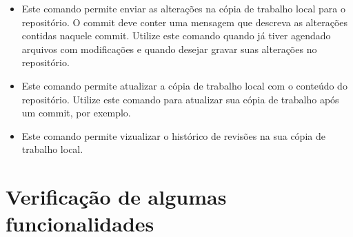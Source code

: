 \begin{itemize}
\item \colorbox{Gray}{
	\begin{minipage}{.57\linewidth}
	\end{minipage}
	}

    \subitem Este comando permite enviar as alterações na cópia de trabalho local para o repositório.
	     O commit deve conter uma mensagem que descreva as alterações contidas naquele commit.
	     Utilize este comando quando já tiver agendado arquivos com modificações e quando desejar
	     gravar suas alterações no repositório.

\item \colorbox{Gray}{
	\begin{minipage}{.18\linewidth}
	\end{minipage}
	}

    \subitem Este comando permite atualizar a cópia de trabalho local com o conteúdo do repositório.
	     Utilize este comando para atualizar sua cópia de trabalho após um commit, por exemplo.

\item \label{comando_log}
\colorbox{Gray}{
	\begin{minipage}{.13\linewidth}
	\end{minipage}
	}
    \subitem Este comando permite vizualizar o histórico de revisões na sua cópia de trabalho local.

\end{itemize}

%
%
%
%
%
%
%

\section{Verificação de algumas funcionalidades}

